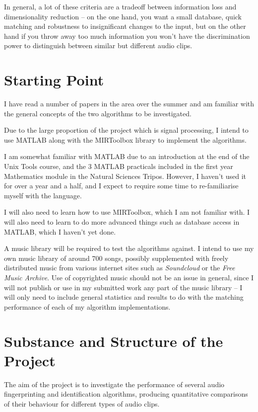 \documentclass[12pt]{article}
\begin{document}
In general, a lot of these criteria are a tradeoff between information loss and dimensionality reduction -- on the one hand, you want a small database, quick matching and robustness to insignificant changes to the input, but on the other hand if you throw away too much information you won't have the discrimination power to distinguish between similar but different audio clips.

\section*{Starting Point}

I have read a number of papers in the area over the summer and am familiar with the general concepts of the two algorithms to be investigated. 

Due to the large proportion of the project which is signal processing, I intend to use MATLAB along with the MIRToolbox library to implement the algorithms.

I am somewhat familiar with MATLAB due to an introduction at the end of the Unix Tools course, and the 3 MATLAB practicals included in the first year Mathematics module in the Natural Sciences Tripos. However, I haven't used it for over a year and a half, and I expect to require some time to re-familiarise myself with the language.

I will also need to learn how to use MIRToolbox, which I am not familiar with. I will also need to learn to do more advanced things such as database access in MATLAB, which I haven't yet done.

A music library will be required to test the algorithms against. I intend to use my own music library of around 700 songs, possibly supplemented with freely distributed music from various internet sites such as \emph{Soundcloud} or the \emph{Free Music Archive}. Use of copyrighted music should not be an issue in general, since I will not publish or use in my submitted work any part of the music library -- I will only need to include general statistics and results to do with the matching performance of each of my algorithm implementations.

\section*{Substance and Structure of the Project}

The aim of the project is to investigate the performance of several audio fingerprinting and identification algorithms, producing quantitative comparisons of their behaviour for different types of audio clips. 
\end{document}
